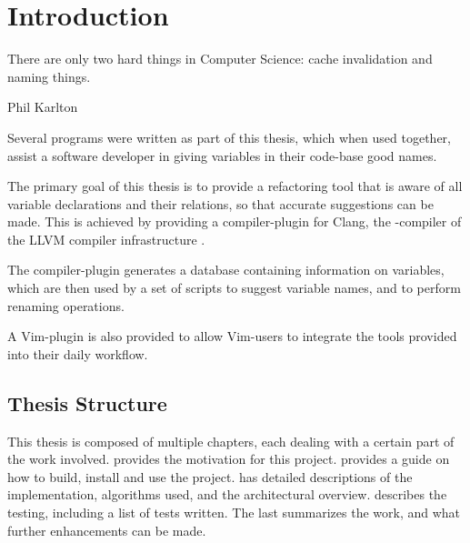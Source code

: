\chapter{Introduction}
\label{chap:Introduction}

\epigraph{There are only two hard things in Computer Science: cache invalidation
	and naming things.}{Phil Karlton}

Several programs were written as part of this thesis, which when used together,
assist a software developer in giving variables in their \CC{} code-base good
names.

The primary goal of this thesis is to provide a refactoring tool that is aware
of all variable declarations and their relations, so that accurate suggestions
can be made. This is achieved by providing a compiler-plugin for Clang, the
\CC{}-compiler of the LLVM compiler infrastructure \cite{llvm}.

The compiler-plugin generates a database containing information on variables,
which are then used by a set of scripts to suggest variable names, and to
perform renaming operations.

A Vim-plugin is also provided to allow Vim-users to integrate the tools provided
into their daily workflow.

\section{Thesis Structure}
This thesis is composed of multiple chapters, each dealing with a certain part
of the work involved.
 provides the motivation for this project.
 provides a guide on how to build, install and use the
project.
 has detailed descriptions of the implementation,
algorithms used, and the architectural overview.
 describes the testing, including a list of tests written.
The last  summarizes the work, and what further enhancements
can be made.
